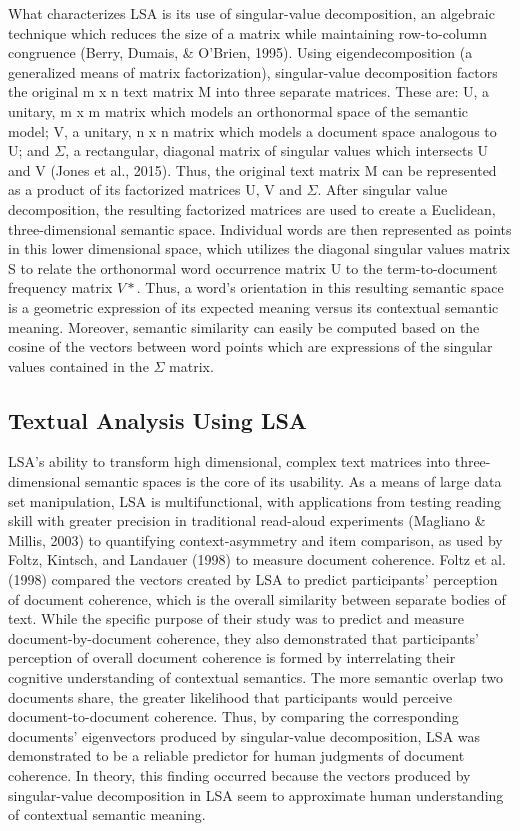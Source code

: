 \documentclass[english,man]{apa6}
\theoremstyle{definition}
\theoremstyle{definition}
\theoremstyle{definition}
\theoremstyle{remark}
\begin{document}
What characterizes LSA is its use of singular-value decomposition, an
algebraic technique which reduces the size of a matrix while maintaining
row-to-column congruence (Berry, Dumais, \& O'Brien, 1995). Using
eigendecomposition (a generalized means of matrix factorization),
singular-value decomposition factors the original m x n text matrix M
into three separate matrices. These are: U, a unitary, m x m matrix
which models an orthonormal space of the semantic model; V, a unitary, n
x n matrix which models a document space analogous to U; and \(\Sigma\),
a rectangular, diagonal matrix of singular values which intersects U and
V (Jones et al., 2015). Thus, the original text matrix M can be
represented as a product of its factorized matrices U, V and \(\Sigma\).
After singular value decomposition, the resulting factorized matrices
are used to create a Euclidean, three-dimensional semantic space.
Individual words are then represented as points in this lower
dimensional space, which utilizes the diagonal singular values matrix S
to relate the orthonormal word occurrence matrix U to the
term-to-document frequency matrix \(V*\). Thus, a word's orientation in
this resulting semantic space is a geometric expression of its expected
meaning versus its contextual semantic meaning. Moreover, semantic
similarity can easily be computed based on the cosine of the vectors
between word points which are expressions of the singular values
contained in the \(\Sigma\) matrix.

\subsection{Textual Analysis Using
LSA}\label{textual-analysis-using-lsa}

LSA's ability to transform high dimensional, complex text matrices into
three-dimensional semantic spaces is the core of its usability. As a
means of large data set manipulation, LSA is multifunctional, with
applications from testing reading skill with greater precision in
traditional read-aloud experiments (Magliano \& Millis, 2003) to
quantifying context-asymmetry and item comparison, as used by Foltz,
Kintsch, and Landauer (1998) to measure document coherence. Foltz et al.
(1998) compared the vectors created by LSA to predict participants'
perception of document coherence, which is the overall similarity
between separate bodies of text. While the specific purpose of their
study was to predict and measure document-by-document coherence, they
also demonstrated that participants' perception of overall document
coherence is formed by interrelating their cognitive understanding of
contextual semantics. The more semantic overlap two documents share, the
greater likelihood that participants would perceive document-to-document
coherence. Thus, by comparing the corresponding documents' eigenvectors
produced by singular-value decomposition, LSA was demonstrated to be a
reliable predictor for human judgments of document coherence. In theory,
this finding occurred because the vectors produced by singular-value
decomposition in LSA seem to approximate human understanding of
contextual semantic meaning.
\end{document}
